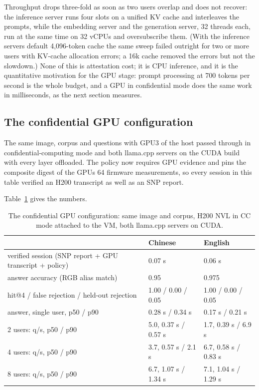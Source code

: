 \documentclass[letterpaper,twocolumn,10pt]{article}
\begin{document}
Throughput drops three-fold as soon as two users overlap and does not recover: the inference server runs four slots on a unified KV cache and interleaves the prompts, while the embedding server and the generation server, 32 threads each, run at the same time on 32 vCPUs and oversubscribe them. (With the inference server\textquotesingle s default 4,096-token cache the same sweep failed outright for two or more users with KV-cache allocation errors; a 16k cache removed the errors but not the slowdown.) None of this is attestation cost; it is CPU inference, and it is the quantitative motivation for the GPU stage: prompt processing at 700 tokens per second is the whole budget, and a GPU in confidential mode does the same work in milliseconds, as the next section measures.

\subsection{The confidential GPU configuration}\label{the-confidential-gpu-configuration}

The same image, corpus and questions with GPU3 of the host passed through in confidential-computing mode and both llama.cpp servers on the CUDA build with every layer offloaded. The policy now requires GPU evidence and pins the composite digest of the GPU\textquotesingle s 64 firmware measurements, so every session in this table verified an H200 transcript as well as an SNP report.

Table~\ref{tab:gpu} gives the numbers.

\begin{table}[t]\centering\small\setlength{\tabcolsep}{4pt}
\begin{tabular}{p{1.6in}p{0.95in}p{0.95in}}\toprule
 & \textbf{Chinese} & \textbf{English} \\ \midrule
verified session (SNP report + GPU transcript + policy) & 0.07 s & 0.06 s \\
answer accuracy (RGB alias match) & 0.95 & 0.975 \\
hit@4 / false rejection / held-out rejection & 1.00 / 0.00 / 0.05 & 1.00 / 0.00 / 0.05 \\
answer, single user, p50 / p90 & 0.28 s / 0.34 s & 0.17 s / 0.21 s \\
2 users: q/s, p50 / p90 & 5.0, 0.37 s / 0.57 s & 1.7, 0.39 s / 6.9 s \\
4 users: q/s, p50 / p90 & 3.7, 0.57 s / 2.1 s & 6.7, 0.58 s / 0.83 s \\
8 users: q/s, p50 / p90 & 6.7, 1.07 s / 1.34 s & 7.1, 1.04 s / 1.29 s \\
\bottomrule\end{tabular}
\caption{The confidential GPU configuration: same image and corpus, H200 NVL in CC mode attached to the VM, both llama.cpp servers on CUDA.}\label{tab:gpu}
\end{table}
\end{document}
